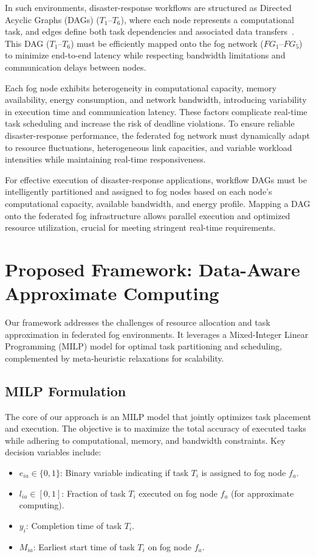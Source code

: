 \documentclass[conference]{IEEEtran}
\begin{document}
In such environments, disaster-response workflows are structured as Directed Acyclic Graphs (DAGs) (\( T_1 \)--\( T_6 \)), where each node represents a computational task, and edges define both task dependencies and associated data transfers~\cite{dragoni2017microservices}. This DAG (\( T_1 \)--\( T_6 \)) must be efficiently mapped onto the fog network (\( FG_1 \)--\( FG_5 \)) to minimize end-to-end latency while respecting bandwidth limitations and communication delays between nodes.

Each fog node exhibits heterogeneity in computational capacity, memory availability, energy consumption, and network bandwidth, introducing variability in execution time and communication latency. These factors complicate real-time task scheduling and increase the risk of deadline violations. To ensure reliable disaster-response performance, the federated fog network must dynamically adapt to resource fluctuations, heterogeneous link capacities, and variable workload intensities while maintaining real-time responsiveness.

For effective execution of disaster-response applications, workflow DAGs must be intelligently partitioned and assigned to fog nodes based on each node’s computational capacity, available bandwidth, and energy profile. Mapping a DAG onto the federated fog infrastructure allows parallel execution and optimized resource utilization, crucial for meeting stringent real-time requirements.

\section{Proposed Framework: Data-Aware Approximate Computing}

Our framework addresses the challenges of resource allocation and task approximation in federated fog environments. It leverages a Mixed-Integer Linear Programming (MILP) model for optimal task partitioning and scheduling, complemented by meta-heuristic relaxations for scalability.

\subsection{MILP Formulation}

The core of our approach is an MILP model that jointly optimizes task placement and execution. The objective is to maximize the total accuracy of executed tasks while adhering to computational, memory, and bandwidth constraints. Key decision variables include:
\begin{itemize}
    \item \(e_{ia} \in \{0,1\}\): Binary variable indicating if task \(T_i\) is assigned to fog node \(f_a\).
    \item \(l_{ia} \in [0,1]\): Fraction of task \(T_i\) executed on fog node \(f_a\) (for approximate computing).
    \item \(y_i\): Completion time of task \(T_i\).
    \item \(M_{ia}\): Earliest start time of task \(T_i\) on fog node \(f_a\).
\end{itemize}
\end{document}
